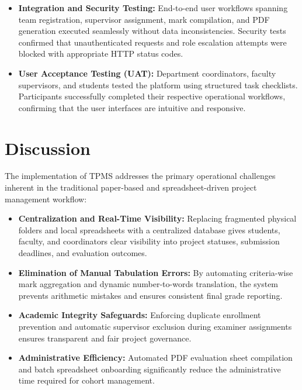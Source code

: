 \documentclass[12pt,a4paper]{report}
\begin{document}
\begin{itemize}
  \item \textbf{Integration and Security Testing:} End-to-end user workflows spanning team registration, supervisor assignment, mark compilation, and PDF generation executed seamlessly without data inconsistencies. Security tests confirmed that unauthenticated requests and role escalation attempts were blocked with appropriate HTTP status codes.
  
  \item \textbf{User Acceptance Testing (UAT):} Department coordinators, faculty supervisors, and students tested the platform using structured task checklists. Participants successfully completed their respective operational workflows, confirming that the user interfaces are intuitive and responsive.
\end{itemize}

\section{Discussion}
The implementation of TPMS addresses the primary operational challenges inherent in the traditional paper-based and spreadsheet-driven project management workflow:

\begin{itemize}
  \item \textbf{Centralization and Real-Time Visibility:} Replacing fragmented physical folders and local spreadsheets with a centralized database gives students, faculty, and coordinators clear visibility into project statuses, submission deadlines, and evaluation outcomes.
  
  \item \textbf{Elimination of Manual Tabulation Errors:} By automating criteria-wise mark aggregation and dynamic number-to-words translation, the system prevents arithmetic mistakes and ensures consistent final grade reporting.
  
  \item \textbf{Academic Integrity Safeguards:} Enforcing duplicate enrollment prevention and automatic supervisor exclusion during examiner assignments ensures transparent and fair project governance.
  
  \item \textbf{Administrative Efficiency:} Automated PDF evaluation sheet compilation and batch spreadsheet onboarding significantly reduce the administrative time required for cohort management.
\end{itemize}
\end{document}
